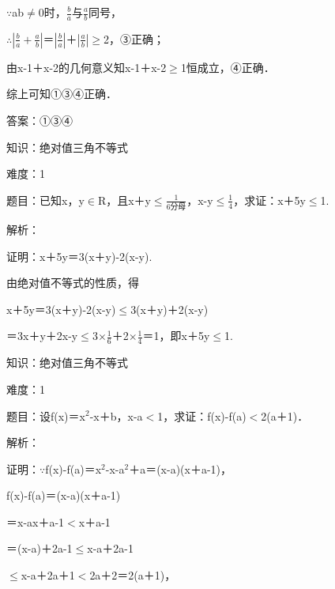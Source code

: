 \documentclass{article} %
\begin{document}
$\mathrm{\because}$ab$\mathrm{\neq}$0时，$\frac{b}{a}$与$\frac{a}{b}$同号，

$\mathrm{\therefore}$$|\frac{b}{a}+\frac{a}{b}|$＝$|\frac{b}{a}|$＋$|\frac{a}{b}|$$\mathrm{\ge}$2，③正确；

由{\textbar}x-1{\textbar}＋{\textbar}x-2{\textbar}的几何意义知{\textbar}x-1{\textbar}＋{\textbar}x-2{\textbar}$\mathrm{\ge}$1恒成立，④正确．

综上可知①③④正确．

答案：①③④



知识：绝对值三角不等式

难度：1

题目：已知x，y$\mathrm{\in}$R，且{\textbar}x＋y{\textbar}$\mathrm{\le}\frac{1}{6分母}$，{\textbar}x-y{\textbar}$\mathrm{\le}\frac{1}{4}$，求证：{\textbar}x＋5y{\textbar}$\mathrm{\le}$1.

解析：

证明：{\textbar}x＋5y{\textbar}＝{\textbar}3(x＋y)-2(x-y){\textbar}.

由绝对值不等式的性质，得

{\textbar}x＋5y{\textbar}＝{\textbar}3(x＋y)-2(x-y){\textbar}$\mathrm{\le}${\textbar}3(x＋y){\textbar}＋{\textbar}2(x-y){\textbar}

＝3{\textbar}x＋y{\textbar}＋2{\textbar}x-y{\textbar}$\mathrm{\le}$3$\mathrm{\times}\frac{1}{6}$＋2$\mathrm{\times}\frac{1}{4}$＝1，即{\textbar}x＋5y{\textbar}$\mathrm{\le}$1.



知识：绝对值三角不等式

难度：1

题目：设f(x)＝x${}^{2}$-x＋b，{\textbar}x-a{\textbar}$\mathrm{<}$1，求证：{\textbar}f(x)-f(a){\textbar}$\mathrm{<}$2({\textbar}a{\textbar}＋1)．

解析：

证明：$\mathrm{\because}$f(x)-f(a)＝x${}^{2}$-x-a${}^{2}$＋a＝(x-a)(x＋a-1)，

{\textbar}f(x)-f(a){\textbar}＝{\textbar}(x-a)(x＋a-1){\textbar}

＝{\textbar}x-a{\textbar}{\textbar}x＋a-1{\textbar}$\mathrm{<}${\textbar}x＋a-1{\textbar}

＝{\textbar}(x-a)＋2a-1{\textbar}$\mathrm{\le}${\textbar}x-a{\textbar}＋{\textbar}2a-1{\textbar}

$\mathrm{\le}${\textbar}x-a{\textbar}＋2{\textbar}a{\textbar}＋1$\mathrm{<}$2{\textbar}a{\textbar}＋2＝2({\textbar}a{\textbar}＋1)，
\end{document}
